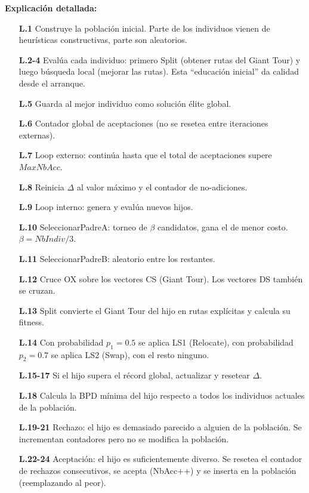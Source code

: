 \documentclass[12pt,a4paper]{article}
\begin{document}
\textbf{Explicación detallada:}

\begin{itemize}[leftmargin=2cm]
\item[\textbf{L.1}] Construye la población inicial. Parte de los individuos vienen de heurísticas constructivas, parte son aleatorios.
\item[\textbf{L.2-4}] Evalúa cada individuo: primero Split (obtener rutas del Giant Tour) y luego búsqueda local (mejorar las rutas). Esta ``educación inicial'' da calidad desde el arranque.
\item[\textbf{L.5}] Guarda al mejor individuo como solución élite global.
\item[\textbf{L.6}] Contador global de aceptaciones (no se resetea entre iteraciones externas).
\item[\textbf{L.7}] Loop externo: continúa hasta que el total de aceptaciones supere $MaxNbAcc$.
\item[\textbf{L.8}] Reinicia $\Delta$ al valor máximo y el contador de no-adiciones.
\item[\textbf{L.9}] Loop interno: genera y evalúa nuevos hijos.
\item[\textbf{L.10}] SeleccionarPadreA: torneo de $\beta$ candidatos, gana el de menor costo. $\beta = NbIndiv/3$.
\item[\textbf{L.11}] SeleccionarPadreB: aleatorio entre los restantes.
\item[\textbf{L.12}] Cruce OX sobre los vectores CS (Giant Tour). Los vectores DS también se cruzan.
\item[\textbf{L.13}] Split convierte el Giant Tour del hijo en rutas explícitas y calcula su fitness.
\item[\textbf{L.14}] Con probabilidad $p_1=0.5$ se aplica LS1 (Relocate), con probabilidad $p_2=0.7$ se aplica LS2 (Swap), con el resto ninguno.
\item[\textbf{L.15-17}] Si el hijo supera el récord global, actualizar y resetear $\Delta$.
\item[\textbf{L.18}] Calcula la BPD mínima del hijo respecto a todos los individuos actuales de la población.
\item[\textbf{L.19-21}] Rechazo: el hijo es demasiado parecido a alguien de la población. Se incrementan contadores pero no se modifica la población.
\item[\textbf{L.22-24}] Aceptación: el hijo es suficientemente diverso. Se resetea el contador de rechazos consecutivos, se acepta (NbAcc++) y se inserta en la población (reemplazando al peor).

\end{itemize}
\end{document}
